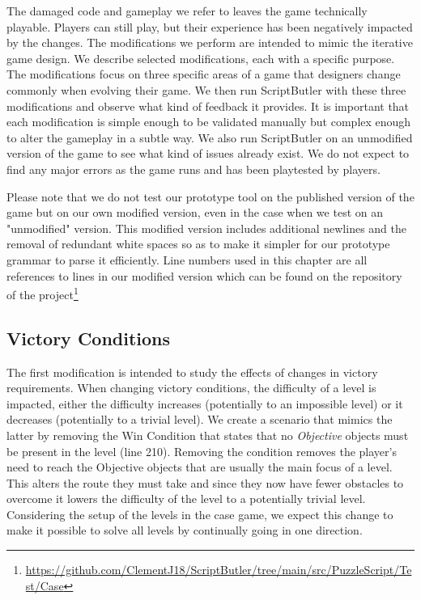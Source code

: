 The damaged code and gameplay we refer to leaves the game technically playable. Players can still play, but their experience has been negatively impacted by the changes. The modifications we perform are intended to mimic the iterative game design. We describe selected modifications, each with a specific purpose. The modifications focus on three specific areas of a game that designers change commonly when evolving their game. We then run ScriptButler with these three modifications and observe what kind of feedback it provides. It is important that each modification is simple enough to be validated manually but complex enough to alter the gameplay in a subtle way. We also run ScriptButler on an unmodified version of the game to see what kind of issues already exist. We do not expect to find any major errors as the game runs and has been playtested by players.

Please note that we do not test our prototype tool on the published version of the game but on our own modified version, even in the case when we test on an "unmodified" version. This modified version includes additional newlines and the removal of redundant white spaces so as to make it simpler for our prototype grammar to parse it efficiently. Line numbers used in this chapter are all references to lines in our modified version which can be found on the repository of the project\footnote{\url{https://github.com/ClementJ18/ScriptButler/tree/main/src/PuzzleScript/Test/Case}}

\subsection{Victory Conditions}
The first modification is intended to study the effects of changes in victory requirements. When changing victory conditions, the difficulty of a level is impacted, either the difficulty increases (potentially to an impossible level) or it decreases (potentially to a trivial level). We create a scenario that mimics the latter by removing the Win Condition that states that no \emph{Objective} objects must be present in the level (line 210). Removing the condition removes the player's need to reach the Objective objects that are usually the main focus of a level. This alters the route they must take and since they now have fewer obstacles to overcome it lowers the difficulty of the level to a potentially trivial level. Considering the setup of the levels in the case game, we expect this change to make it possible to solve all levels by continually going in one direction.

